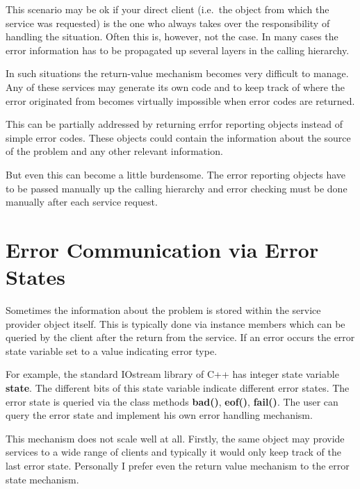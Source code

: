 This scenario may be ok if your direct client (i.e.\ the object from which
the service was requested) is the one who always takes over the 
responsibility of handling the situation. Often this is, however,
not the case. In many cases the error information has to be propagated 
up several layers in the calling hierarchy. 

In such situations the return-value mechanism becomes very difficult
to manage. Any of these services may generate its own code and to keep
track of where the error originated from becomes virtually impossible
when error codes are returned. 

This can be partially addressed by returning errfor reporting objects 
instead of simple error codes. These objects could contain the 
information about the source of the problem and any other relevant
information. 

But even this can become a little burdensome. The error reporting
objects have to be passed manually up the calling hierarchy and 
error checking must be done manually after each service request.


\section{Error Communication via Error States}

Sometimes the information about the problem is stored within the
service provider object itself. This is typically done via
instance members which can be 
queried by the client after the return from the service. 
If an error occurs the error state variable set to a value indicating error type.

For example, the standard IOstream library of C++ has integer state variable {\bf state}.
The different bits of this state variable indicate different error states.
The error state is queried via the class methods {\bf bad()}, {\bf eof()}, {\bf fail()}.
The user can query the error state and implement his own error handling mechanism.

This mechanism does not scale well at all. Firstly, the same object may
provide services to a wide range of clients and typically it would only
keep track of the last error state. Personally I prefer even the return
value mechanism to the error state mechanism.


